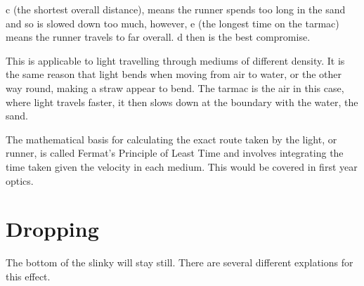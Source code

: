 c (the shortest overall distance), means the runner spends too long in the sand and so is slowed down too much, however, e (the longest time on the tarmac) means the runner travels to far overall. d then is the best compromise.

This is applicable to light travelling through mediums of different density. It is the same reason that light bends when moving from air to water, or the other way round, making a straw appear to bend. The tarmac is the air in this case, where light travels faster, it then slows down at the boundary with the water, the sand.

The mathematical basis for calculating the exact route taken by the light, or runner, is called Fermat's Principle of Least Time and involves integrating the time taken given the velocity in each medium. This would be covered in first year optics.

\section{Dropping}
The bottom of the slinky will stay still. There are several different explations for this effect. 

